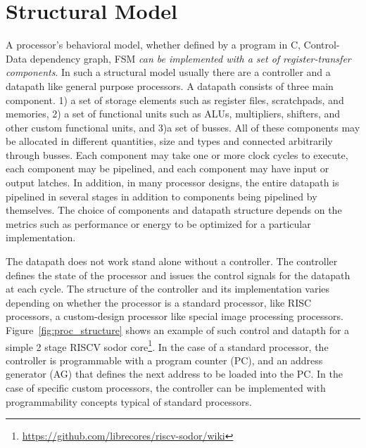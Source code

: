 \section{Structural Model}

A processor’s behavioral model, whether defined by a program in C, Control-Data dependency graph, FSM \emph{can be implemented with a set of register-transfer components}.
In such a structural model usually there are a controller and a datapath like general purpose processors.
A datapath consists of three main component. 1) a set of storage elements such as register files, scratchpads, and memories, 2) a set of functional units such as ALUs, multipliers, shifters, and other custom functional units, and 3)a set of busses.
All of these components may be allocated in different quantities, size and types and connected arbitrarily through busses.
Each component may take one or more clock cycles to execute, each component may be pipelined, and each component may have input or output latches.
In addition, in many processor designs, the entire datapath is pipelined in several stages in addition to components being pipelined by themselves.
The choice of components and datapath structure depends on the metrics such as performance or energy to be optimized for a particular implementation.

The datapath does not work stand alone without a controller.
The controller defines the state of the processor and issues the control signals for the datapath at each cycle.
The structure of the controller and its implementation varies depending on whether the processor is a standard processor, like RISC processors, a custom-design processor like special image processing processors. 
Figure~\ref{fig:proc_structure} shows an example of such control and datapth for a simple 2 stage RISCV sodor core\footnote{\url{https://github.com/librecores/riscv-sodor/wiki}}.
In the case of a standard processor, the controller is programmable with a program counter (PC), and an address generator (AG) that defines the next address to be loaded into the PC.
In the case of specific custom processors, the controller can be implemented with programmability concepts typical of standard processors.



